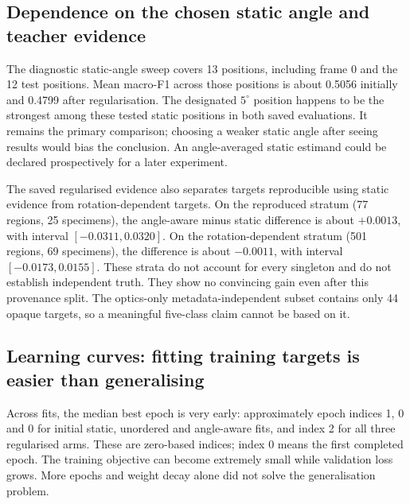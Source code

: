 \subsection{Dependence on the chosen static angle and teacher evidence}
The diagnostic static-angle sweep covers 13 positions, including frame 0 and the 12 test positions. Mean macro-F1 across those positions is about 0.5056 initially and 0.4799 after regularisation. The designated $5^\circ$ position happens to be the strongest among these tested static positions in both saved evaluations. It remains the primary comparison; choosing a weaker static angle after seeing results would bias the conclusion. An angle-averaged static estimand could be declared prospectively for a later experiment.

The saved regularised evidence also separates targets reproducible using static evidence from rotation-dependent targets. On the reproduced stratum (77 regions, 25 specimens), the angle-aware minus static difference is about $+0.0013$, with interval $[-0.0311,0.0320]$. On the rotation-dependent stratum (501 regions, 69 specimens), the difference is about $-0.0011$, with interval $[-0.0173,0.0155]$. These strata do not account for every singleton and do not establish independent truth. They show no convincing gain even after this provenance split. The optics-only metadata-independent subset contains only 44 opaque targets, so a meaningful five-class claim cannot be based on it.

\subsection{Learning curves: fitting training targets is easier than generalising}
Across fits, the median best epoch is very early: approximately epoch indices 1, 0 and 0 for initial static, unordered and angle-aware fits, and index 2 for all three regularised arms. These are zero-based indices; index 0 means the first completed epoch. The training objective can become extremely small while validation loss grows. More epochs and weight decay alone did not solve the generalisation problem.

